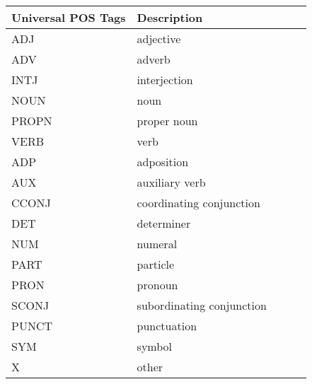 \begin{table}[h!]
\begin{tabular}{@{}lllll@{}}
\toprule
\textbf{Universal POS Tags} & \textbf{Description}\\ \midrule
ADJ & adjective\\
ADV & adverb\\
INTJ & interjection\\
NOUN & noun\\
PROPN & proper noun\\
VERB & verb\\\midrule
ADP & adposition\\
AUX & auxiliary verb\\
CCONJ & coordinating conjunction\\
DET & determiner\\
NUM & numeral\\
PART & particle\\
PRON & pronoun\\
SCONJ & subordinating conjunction\\\midrule
PUNCT & punctuation\\
SYM & symbol\\
X & other\\\bottomrule
\end{tabular}
\end{table}
